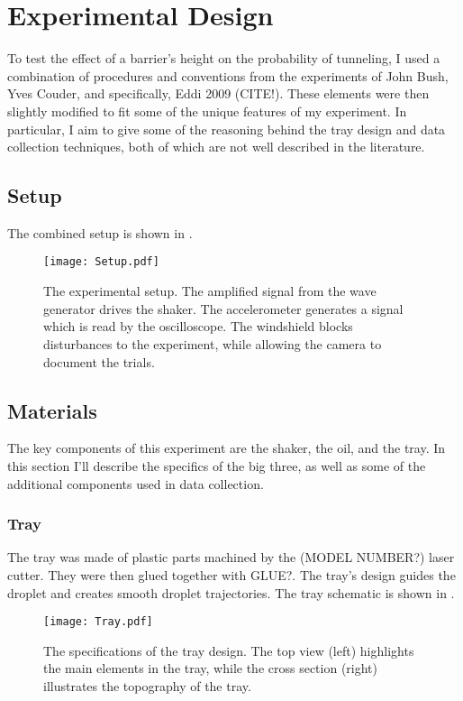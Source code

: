 \chapter{Experimental Design}

To test the effect of a barrier's height on the probability of tunneling, I used a combination of procedures and conventions from the experiments of John Bush, Yves Couder, and specifically, Eddi 2009 (CITE!). These elements were then slightly modified to fit some of the unique features of my experiment. In particular, I aim to give some of the reasoning behind the tray design and data collection techniques, both of which are not well described in the literature.

\section{Setup}
    The combined setup is shown in .
    
\begin{figure}[h!]
	\centering
	\texttt{[image: Setup.pdf]}
	\caption{The experimental setup. The amplified signal from the wave generator drives the shaker. The accelerometer generates a signal which is read by the oscilloscope. The windshield blocks disturbances to the experiment, while allowing the camera to document the trials.}
	\label{setup}
\end{figure}

\section{Materials}
The key components of this experiment are the shaker, the oil, and the tray. In this section I'll describe the specifics of the big three, as well as some of the additional components used in data collection. 

\subsection{Tray}
The tray was made of plastic parts machined by the (MODEL NUMBER?) laser cutter. They were then glued together with GLUE?. The tray's design guides the droplet and creates smooth droplet trajectories. The tray schematic is shown in . 

\begin{figure}[h!]
	\centering
	\texttt{[image: Tray.pdf]}
	\caption{The specifications of the tray design. The top view (left) highlights the main elements in the tray, while the cross section (right) illustrates the topography of the tray.}
	\label{tray}
\end{figure}

